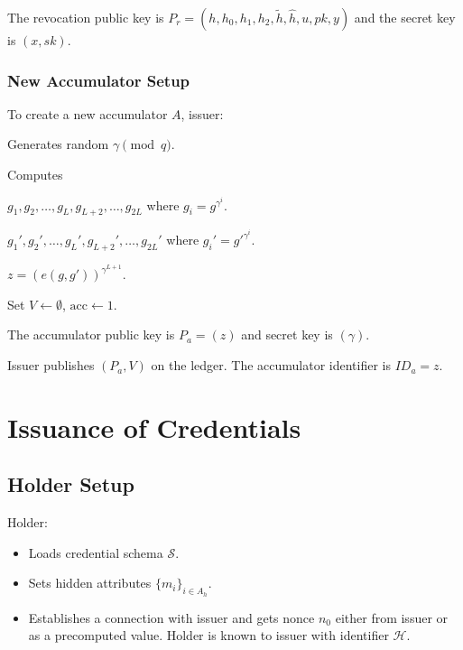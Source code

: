 \documentclass[a4paper]{article}
\begin{document}
The revocation public key is
$P_r = (h,h_0,h_1,h_2,\widetilde{h},\widehat{h},u,pk,y)$ and the secret key is $(x,sk)$.
\subsubsection{New Accumulator Setup}
To create a new accumulator $A$, issuer:
\begin{legal}
\item Generates random $\gamma\pmod{q}$.
\item Computes
\begin{legal}
    \item $g_1,g_2,\ldots,g_L,g_{L+2},\ldots,g_{2L}$ where
$g_i = g^{\gamma^i}$.
    \item $g_1',g_2',\ldots,g_L',g_{L+2}',\ldots,g_{2L}'$ where
$g_i' = g'^{\gamma^i}$.
    \item $z = (e(g,g'))^{\gamma^{L+1}}$.
\end{legal}
\item Set $V \leftarrow\emptyset$, $\mathrm{acc}\leftarrow 1$.
\end{legal}
The accumulator public key is $P_a = (z)$ and secret key is $(\gamma)$.

Issuer publishes $(P_a,V)$ on the ledger. The accumulator identifier is $ID_a = z$.

\section{Issuance of Credentials}

\subsection{Holder Setup}

Holder:
\begin{itemize}
    \item Loads credential schema $\mathcal{S}$.
    \item Sets hidden attributes $\{m_i\}_{i \in A_h}$.
    \item Establishes a connection with issuer and gets nonce $n_0$ either from issuer or as a precomputed value. Holder is known to issuer with identifier $\mathcal{H}$.
\end{itemize}
\end{document}
